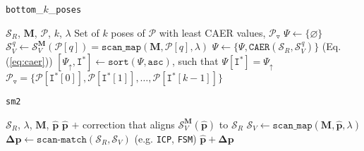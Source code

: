 \begin{algorithm}[]
  \caption{\texttt{bottom}\_$k$\_\texttt{poses}}
  \begin{spacing}{1.0}
  \begin{algorithmic}[1]
    \REQUIRE $\mathcal{S}_R$, $\bm{M}$, $\mathcal{P}$, $k$, $\lambda$
    \ENSURE Set of $k$ poses of $\mathcal{P}$ with least CAER values, $\mathcal{P}_{\triangledown}$
    \STATE $\Psi \leftarrow \{\varnothing \}$
      \STATE $\mathcal{S}_V^{\hspace{1pt} q} \leftarrow \mathcal{S}_V^{\bm{M}}(\mathcal{P}[q]) = \texttt{scan\_map}(\bm{M}, \mathcal{P}[q], \lambda)$
      \STATE $\Psi \leftarrow \{\Psi, \texttt{CAER}(\mathcal{S}_R, \mathcal{S}_V^{\hspace{1pt} q}) \}$ \hfill {\small (Eq. (\ref{eq:caer})})
    \ENDFOR
    \STATE $[\Psi_{\uparrow}, \texttt{I}^{\ast}] \leftarrow \texttt{sort}(\Psi, \texttt{asc})$, such that $\Psi[\texttt{I}^{\ast}] = \Psi_{\uparrow}$
    \RETURN $\mathcal{P}_{\triangledown} = \{\mathcal{P}[\texttt{I}^{\ast}[0]], \mathcal{P}[\texttt{I}^{\ast}[1]], \dots, \mathcal{P}[\texttt{I}^{\ast}[k-1]]\}$
  \end{algorithmic}
  \end{spacing}
  \label{alg:bottom_k}
\end{algorithm}

\begin{algorithm}[]
  \caption{\texttt{sm2}}
  \begin{spacing}{1.0}
  \begin{algorithmic}[1]
    \REQUIRE $\mathcal{S}_R$, $\lambda$, $\bm{M}$, $\hat{\bm{p}}$
    \ENSURE $\hat{\bm{p}}$ $+$ correction that aligns $\mathcal{S}_V^{\bm{M}}(\hat{\bm{p}})$ to $\mathcal{S}_R$
    \STATE $\mathcal{S}_V \leftarrow \texttt{scan\_map}(\bm{M}, \hat{\bm{p}}, \lambda)$
    \STATE $\bm{\Delta p} \leftarrow \texttt{scan-match}(\mathcal{S}_R,\mathcal{S}_V)$ \hfill {\footnotesize (e.g. \texttt{ICP}\cite{Vizzo2023}, \texttt{FSM}\cite{Filotheou2022f}})
    \RETURN $\hat{\bm{p}} + \bm{\Delta p}$
  \end{algorithmic}
  \end{spacing}
  \label{alg:sm2}
\end{algorithm}
